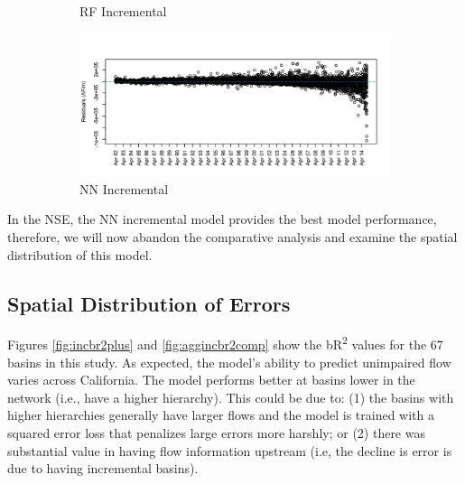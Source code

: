 \begin{figure}
\begin{subfigure}{.5\textwidth}
  		\caption{RF Incremental}
  		\label{fig:restimerf}
	\end{subfigure}%
	\begin{subfigure}{.5\textwidth}
  		\centering
  		\includegraphics[width=\textwidth, trim={0 0 0 1cm}, clip=true]{plots/rplot22_nnlogo_residovertime_inc.png}
  		\caption{NN Incremental}
  		\label{fig:restimenn}
	\end{subfigure}
	\caption{}
	\label{fig:resovertime}
\end{figure}

In the NSE, the NN incremental model provides the best model performance, therefore, we will now abandon the comparative analysis and examine the spatial distribution of this model.

\subsection{Spatial Distribution of Errors}
Figures \ref{fig:incbr2plus} and \ref{fig:aggincbr2comp} show the bR\textsuperscript{2} values for the 67 basins in this study. As expected, the model's ability to predict unimpaired flow varies across California. The model performs better at basins  lower in the network (i.e., have a higher hierarchy). This could be due to: (1) the basins with higher hierarchies generally have larger flows and the model is trained with a squared error loss that penalizes large errors more harshly; or (2) there was substantial value in having flow information upstream (i.e, the decline is error is due to having incremental basins). 

